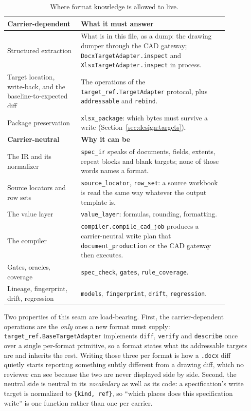 \begin{table}[htbp]
\centering
\caption{Where format knowledge is allowed to live.}
\label{tab:design:layers}
\begin{tabular}{p{0.30\linewidth}p{0.60\linewidth}}
\hline
\textbf{Carrier-dependent} & \textbf{What it must answer} \\
\hline
Structured extraction & What is in this file, as a dump: the drawing dumper through the CAD
gateway; \texttt{DocxTargetAdapter.inspect} and \texttt{XlsxTargetAdapter.inspect} in
process. \\
Target location, write-back, and the baseline-to-expected diff & The operations of the
\texttt{target\_ref.TargetAdapter} protocol, plus \texttt{addressable} and
\texttt{rebind}. \\
Package preservation & \texttt{xlsx\_package}: which bytes must survive a write
(Section~\ref{sec:design:targets}). \\
\hline
\textbf{Carrier-neutral} & \textbf{Why it can be} \\
\hline
The IR and its normalizer & \texttt{spec\_ir} speaks of documents, fields, extents, repeat
blocks and blank targets; none of those words names a format. \\
Source locators and row sets & \texttt{source\_locator}, \texttt{row\_set}: a source
workbook is read the same way whatever the output template is. \\
The value layer & \texttt{value\_layer}: formulas, rounding, formatting. \\
The compiler & \texttt{compiler.compile\_cad\_job} produces a carrier-neutral write plan
that \texttt{document\_production} or the CAD gateway then executes. \\
Gates, oracles, coverage & \texttt{spec\_check}, \texttt{gates}, \texttt{rule\_coverage}. \\
Lineage, fingerprint, drift, regression & \texttt{models}, \texttt{fingerprint},
\texttt{drift}, \texttt{regression}. \\
\hline
\end{tabular}
\end{table}

Two properties of this seam are load-bearing. First, the carrier-dependent operations are
the \emph{only} ones a new format must supply:
\texttt{target\_ref.BaseTargetAdapter} implements \texttt{diff}, \texttt{verify} and
\texttt{describe} once over a single per-format primitive, so a format states what its
addressable targets are and inherits the rest. Writing those three per format is how a
\texttt{.docx} diff quietly starts reporting something subtly different from a drawing
diff, which no reviewer can see because the two are never displayed side by side. Second,
the neutral side is neutral in its \emph{vocabulary} as well as its code: a specification's
write target is normalized to \texttt{\{kind, ref\}}, so ``which places does this
specification write'' is one function rather than one per carrier.

